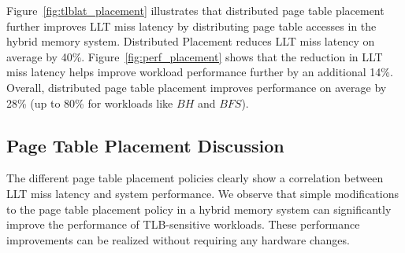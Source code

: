 Figure~\ref{fig:tlblat_placement} illustrates that distributed page
table placement further improves LLT miss latency by distributing page
table accesses in the hybrid memory system. Distributed Placement
reduces LLT miss latency on average by 40\%.
Figure~\ref{fig:perf_placement} shows that the reduction in LLT miss
latency helps improve workload performance further by an additional
14\%. Overall, distributed page table placement improves performance
on average by 28\% (up to 80\% for workloads like $BH$ and $BFS$).





\subsection{Page Table Placement Discussion}


\noindent The different page table placement policies clearly show a
correlation between LLT miss latency and system performance. We
observe that simple modifications to the page table placement policy
in a hybrid memory system can significantly improve the performance of
TLB-sensitive workloads. These performance improvements can be
realized without requiring any hardware changes.

